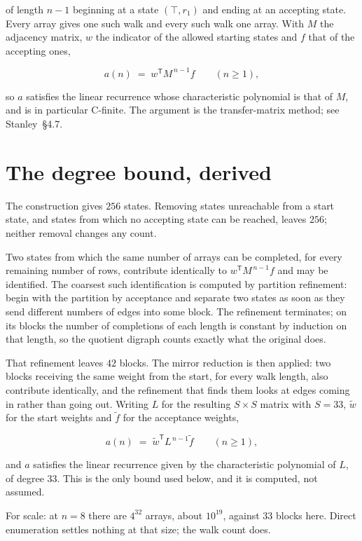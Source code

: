 \documentclass[11pt]{article}
\theoremstyle{definition}
\begin{document}
of length $n-1$ beginning at a state $(\top,r_1)$ and ending at an accepting state. Every array gives one such walk and every such walk one array. With $M$ the adjacency matrix, $w$ the indicator of the allowed starting states and $f$ that of the accepting ones,

\[a(n) \;=\; w^{\mathsf T} M^{\,n-1} f \qquad (n \ge 1),\]

so $a$ satisfies the linear recurrence whose characteristic polynomial is that of $M$, and is in particular C-finite. The argument is the transfer-matrix method; see Stanley~\S4.7.

\section{The degree bound, derived}

The construction gives $256$ states. Removing states unreachable from a start state, and states from which no accepting state can be reached, leaves $256$; neither removal changes any count.

Two states from which the same number of arrays can be completed, for every remaining number of rows, contribute identically to $w^{\mathsf T}M^{\,n-1}f$ and may be identified. The coarsest such identification is computed by partition refinement: begin with the partition by acceptance and separate two states as soon as they send different numbers of edges into some block. The refinement terminates; on its blocks the number of completions of each length is constant by induction on that length, so the quotient digraph counts exactly what the original does.

That refinement leaves $42$ blocks. The mirror reduction is then applied: two blocks receiving the same weight from the start, for every walk length, also contribute identically, and the refinement that finds them looks at edges coming in rather than going out. Writing $L$ for the resulting $S \times S$ matrix with $S = 33$, $\tilde w$ for the start weights and $\tilde f$ for the acceptance weights,

\[a(n) \;=\; \tilde w^{\mathsf T} L^{\,n-1} \tilde f \qquad (n \ge 1),\]

and $a$ satisfies the linear recurrence given by the characteristic polynomial of $L$, of degree $33$. This is the only bound used below, and it is computed, not assumed.

For scale: at $n = 8$ there are $4^{32}$ arrays, about $10^{19}$, against $33$ blocks here. Direct enumeration settles nothing at that size; the walk count does.
\end{document}

